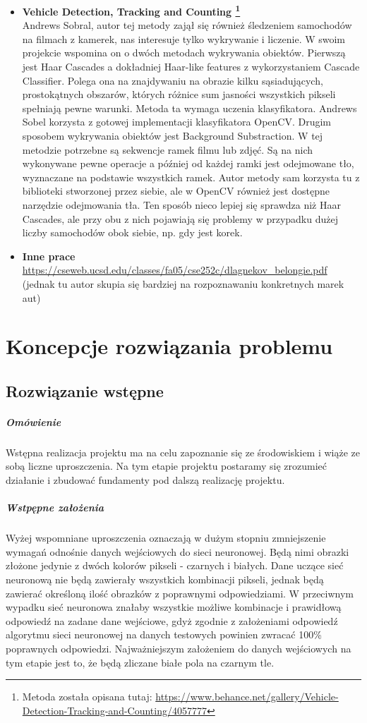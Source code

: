 \documentclass{article}
\begin{document}
\begin{itemize}
\item \textbf{Vehicle Detection, Tracking and Counting \footnote{Metoda została opisana tutaj: {\scriptsize \url{https://www.behance.net/gallery/Vehicle-Detection-Tracking-and-Counting/4057777}}}}\\[0.3cm]
Andrews Sobral, autor tej metody zajął się również śledzeniem samochodów na filmach z kamerek, nas interesuje tylko wykrywanie i liczenie. W swoim projekcie wspomina on o dwóch metodach wykrywania obiektów. Pierwszą jest Haar Cascades a dokładniej Haar-like features z wykorzystaniem Cascade Classifier. Polega ona na znajdywaniu na obrazie kilku sąsiadujących, prostokątnych obszarów, których różnice sum jasności wszystkich pikseli spełniają pewne warunki.  Metoda ta wymaga uczenia klasyfikatora. Andrews Sobel korzysta z gotowej implementacji klasyfikatora OpenCV. Drugim sposobem wykrywania obiektów jest Background Substraction.  W tej metodzie potrzebne są sekwencje ramek filmu lub zdjęć.  Są na nich wykonywane pewne operacje a później od każdej ramki jest odejmowane tło, wyznaczane na podstawie wszystkich ramek. Autor metody sam korzysta tu z biblioteki stworzonej przez siebie, ale w OpenCV również jest dostępne narzędzie odejmowania tła. Ten sposób nieco lepiej się sprawdza niż Haar Cascades, ale przy obu z nich pojawiają się problemy w przypadku dużej liczby samochodów obok siebie, np. gdy jest  korek.
\newpage
\item \textbf{Inne prace}\\[0.3cm]
{\scriptsize \url{https://cseweb.ucsd.edu/classes/fa05/cse252c/dlagnekov_belongie.pdf}} (jednak tu autor skupia się bardziej na rozpoznawaniu konkretnych marek aut)

\end{itemize}

\section{Koncepcje rozwiązania problemu}

\subsection{Rozwiązanie wstępne}
\subparagraph{Omówienie} Wstępna realizacja projektu ma na celu zapoznanie się ze środowiskiem i wiąże ze sobą liczne uproszczenia. Na tym etapie projektu postaramy się zrozumieć działanie i zbudować fundamenty pod dalszą realizację projektu.

\subparagraph{Wstpępne założenia} Wyżej wspomniane uproszczenia oznaczają w dużym stopniu zmniejszenie wymagań odnośnie danych wejściowych do sieci neuronowej. Będą nimi obrazki złożone jedynie z dwóch kolorów pikseli - czarnych i białych. Dane uczące sieć neuronową nie będą zawierały wszystkich kombinacji pikseli, jednak będą zawierać określoną ilość obrazków z poprawnymi odpowiedziami. W przeciwnym wypadku sieć neuronowa znałaby wszystkie możliwe kombinacje i prawidłową odpowiedź na zadane dane wejściowe, gdyż zgodnie z założeniami odpowiedź algorytmu sieci neuronowej na danych testowych powinien zwracać 100\% poprawnych odpowiedzi. Najważniejszym założeniem do danych wejściowych na tym etapie jest to, że będą zliczane białe pola na czarnym tle.
\end{document}
